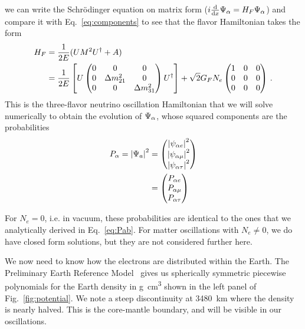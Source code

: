 we can write the Schrödinger equation on matrix form ($i \dv{}{x}\Psi_\alpha = H_F \Psi_\alpha$) and compare it with Eq.~\ref{eq:components} to see that the flavor Hamiltonian takes the form 
\begin{align}\label{eq:H_3gen}
    H_F &= \frac{1}{2E}(U M^2 U^\dagger + A) \nonumber \\
        &= \frac{1}{2E}\left[U \begin{pmatrix}
            0 & 0 & 0 \\
            0 & \dm_{21} & 0 \\
            0 & 0 & \dm_{31}
        \end{pmatrix} U^\dagger\right] + \sqrt{2}G_F N_e \begin{pmatrix}
            1 & 0 & 0 \\
            0 & 0 & 0 \\
            0 & 0 & 0
        \end{pmatrix}\,. 
\end{align}
This is the three-flavor neutrino oscillation Hamiltonian that we will solve numerically to obtain the evolution of $\Psi_\alpha$, whose squared components
are the probabilities
\begin{align}
    P_\alpha = \abs{\Psi_a}^2 &=\begin{pmatrix}
        \abs{\psi_{\alpha e}}^2 \\
        \abs{\psi_{\alpha \mu}}^{2} \\
        \abs{\psi_{\alpha \tau}}^{2}
    \end{pmatrix} \nonumber \\
    &=\begin{pmatrix}
        P_{\alpha e} \\
        P_{\alpha \mu} \\
        P_{\alpha \tau}
    \end{pmatrix} 
\end{align}

For $N_e = 0$, i.e. in vacuum, these probabilities are identical to the ones that we analytically derived in Eq.~\ref{eq:Pab}.
For matter oscillations with $N_e \neq 0$, we do have closed form solutions, but they are not considered further here.

We now need to know how the electrons are distributed within the Earth. The Preliminary Earth Reference Model~\cite{PREM} gives us spherically
symmetric piecewise polynomials for the Earth density in \si{\gram \cm^3} shown in the left panel of Fig.~\ref{fig:potential}.
We note a steep discontinuity at \SI{3480}{\km} where the density is nearly halved. This is the core-mantle boundary, and will be visible in our 
oscillations.

